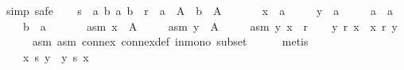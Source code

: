 \begin{isabellebody}
\isamarkupfalse%
\ {\isacharparenleft}{\kern0pt}simp{\isacharcomma}{\kern0pt}\ safe{\isacharparenright}{\kern0pt}\isanewline
\ \ \isamarkupfalse%
\ {\isacharquery}{\kern0pt}s\ {\isacharequal}{\kern0pt}\ {\isachardoublequoteopen}{\isacharbraceleft}{\kern0pt}{\isacharparenleft}{\kern0pt}a{\isacharcomma}{\kern0pt}\ b{\isacharparenright}{\kern0pt}{\isachardot}{\kern0pt}\ {\isacharparenleft}{\kern0pt}a{\isacharcomma}{\kern0pt}\ b{\isacharparenright}{\kern0pt}\ {\isasymin}\ r\ {\isasymand}\ a\ {\isasymin}\ A\ {\isasymand}\ b\ {\isasymin}\ A{\isacharbraceright}{\kern0pt}{\isachardoublequoteclose}\isanewline
\ \ \isamarkupfalse%
\isanewline
\ \ \ \ x\ {\isacharcolon}{\kern0pt}{\isacharcolon}{\kern0pt}\ {\isachardoublequoteopen}{\isacharprime}{\kern0pt}a{\isachardoublequoteclose}\ \isanewline
\ \ \ \ y\ {\isacharcolon}{\kern0pt}{\isacharcolon}{\kern0pt}\ {\isachardoublequoteopen}{\isacharprime}{\kern0pt}a{\isachardoublequoteclose}\ \isanewline
\ \ \ \ a\ {\isacharcolon}{\kern0pt}{\isacharcolon}{\kern0pt}\ {\isachardoublequoteopen}{\isacharprime}{\kern0pt}a{\isachardoublequoteclose}\ \isanewline
\ \ \ \ b\ {\isacharcolon}{\kern0pt}{\isacharcolon}{\kern0pt}\ {\isachardoublequoteopen}{\isacharprime}{\kern0pt}a{\isachardoublequoteclose}\isanewline
\ \ \isamarkupfalse%
\isanewline
\ \ \ \ asm{}{\isacharcolon}{\kern0pt}\ {\isachardoublequoteopen}x\ {\isasymin}\ A{\isachardoublequoteclose}\ \isanewline
\ \ \ \ asm{}{\isacharcolon}{\kern0pt}\ {\isachardoublequoteopen}y\ {\isasymin}\ A{\isachardoublequoteclose}\ \isanewline
\ \ \ \ asm{}{\isacharcolon}{\kern0pt}\ {\isachardoublequoteopen}{\isacharparenleft}{\kern0pt}y{\isacharcomma}{\kern0pt}\ x{\isacharparenright}{\kern0pt}\ {\isasymnotin}\ r{\isachardoublequoteclose}\isanewline
\ \ \isamarkupfalse%
\ {\isachardoublequoteopen}y\ {\isasympreceq}\isactrlsub r\ x\ {\isasymor}\ x\ {\isasympreceq}\isactrlsub r\ y{\isachardoublequoteclose}\isanewline
\ \ \ \ \isamarkupfalse%
\ asm{}\ asm{}\ connex\ connex{\isacharunderscore}{\kern0pt}def\ in{\isacharunderscore}{\kern0pt}mono\ subset\isanewline
\ \ \ \ \isamarkupfalse%
\ metis\isanewline
\ \ \isamarkupfalse%
\isanewline
\ \ \ \ {\isachardoublequoteopen}x\ {\isasympreceq}\isactrlsub {\isacharquery}{\kern0pt}s\ y\ {\isasymor}\ y\ {\isasympreceq}\isactrlsub {\isacharquery}{\kern0pt}s\ x{\isachardoublequoteclose}\isanewline

\end{isabellebody}
